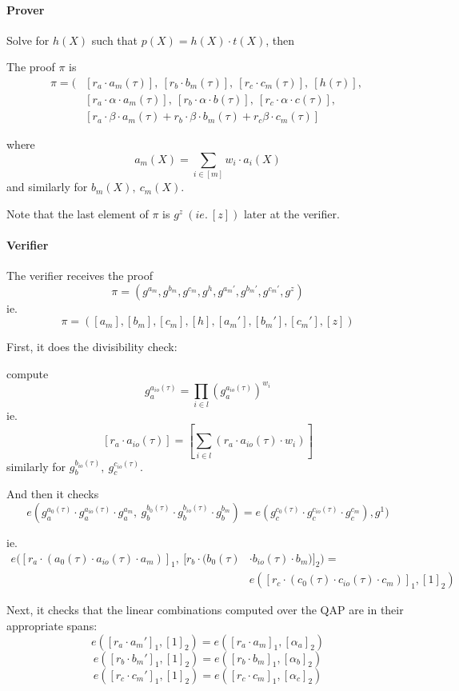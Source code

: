 \documentclass{article}
\begin{document}
\paragraph{Prover}
Solve for $h(X)$ such that $p(X)=h(X) \cdot t(X)$, then

The proof $\pi$ is
\begin{align*}
    \pi = (&[r_a \cdot a_m(\tau)],~ [r_b \cdot b_m(\tau)],~ [r_c \cdot c_m(\tau)],~ [h(\tau)],~\\
	   &[r_a \cdot \alpha \cdot a_m(\tau)],~ [r_b \cdot \alpha \cdot b(\tau)],~ [r_c \cdot \alpha \cdot c(\tau)],\\
	   &[r_a \cdot \beta \cdot a_m(\tau) + r_b \cdot \beta \cdot b_m(\tau) + r_c \beta \cdot c_m(\tau)]
\end{align*}

where
$$a_m(X) = \sum_{i \in [m]} w_i \cdot a_i(X)$$
and similarly for $b_m(X),~ c_m(X)$.

Note that the last element of $\pi$ is $g^z ~(ie.~ [z])$ later at the verifier.

\paragraph{Verifier}
The verifier receives the proof
$$\pi = (g^{a_m}, g^{b_m}, g^{c_m}, g^h, g^{a_m'}, g^{b_m'}, g^{c_m'}, g^z)$$
ie.
$$\pi = ([a_m], [b_m], [c_m], [h], [a_m'], [b_m'], [c_m'], [z])$$


First, it does the divisibility check:

compute
$$g_a^{a_{io}(\tau)} = \prod_{i \in l} (g_a^{a_{io}(\tau)})^{w_i}$$
ie.
$$[r_a \cdot a_{io}(\tau)] = [\sum_{i \in l} (r_a \cdot a_{io}(\tau) \cdot w_i)]$$
similarly for $g_b^{b_{io}(\tau)},~ g_c^{c_{io}(\tau)}$.

And then it checks
$$e(g_a^{a_0(\tau)} \cdot g_a^{a_{io}(\tau)} \cdot g_a^{a_m},~ g_b^{b_0(\tau)} \cdot g_b^{b_{io}(\tau)} \cdot g_b^{b_m}) =
e(g_c^{c_0(\tau)} \cdot g_c^{c_{io}(\tau)} \cdot g_c^{c_m}), g^1)$$

ie.
\begin{align*}
    e([r_a \cdot (a_0(\tau) \cdot a_{io}(\tau) \cdot a_m)]_1,~ [r_b \cdot (b_0(\tau) &\cdot b_{io}(\tau) \cdot b_m)]_2) =\\
&e([r_c \cdot (c_0(\tau) \cdot c_{io}(\tau) \cdot c_m)]_1, [1]_2)
\end{align*}

Next, it checks that the linear combinations computed over the QAP are in their appropriate spans:
$$e([r_a \cdot a_m']_1, [1]_2) = e([r_a \cdot a_m]_1, [\alpha_a]_2)$$
$$e([r_b \cdot b_m']_1, [1]_2) = e([r_b \cdot b_m]_1, [\alpha_b]_2)$$
$$e([r_c \cdot c_m']_1, [1]_2) = e([r_c \cdot c_m]_1, [\alpha_c]_2)$$
\end{document}

